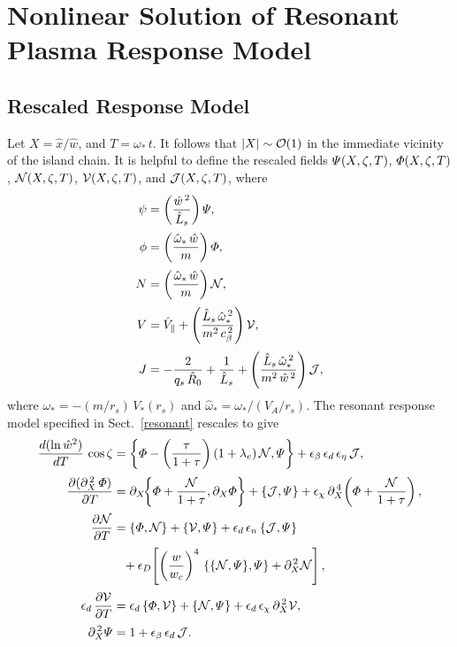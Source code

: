 \documentclass[12pt,prb,aps]{revtex4-1}
\begin{document}
\section{Nonlinear Solution of Resonant Plasma Response Model}
\subsection{Rescaled Response Model}\label{s8.2}
Let
$X = \hat{x}/\hat{w}$,
and
$T = \omega_\ast\,t$.
It follows that $|X|\sim {\cal O}(1)$ in the immediate vicinity of the island chain. It is helpful to define the
rescaled fields ${\mit\Psi}(X,\zeta,T)$, ${\mit\Phi}(X,\zeta,T)$, ${\cal N}(X,\zeta,T)$,
${\cal V}(X,\zeta,T)$, and ${\cal J}(X,\zeta,T)$, where
\begin{align}
\psi&= \left(\frac{\hat{w}^{\,2}}{\hat{L}_s}\right){\mit\Psi},\label{e466}\\[0.5ex]
\phi &=\left(\frac{\hat{\omega}_\ast\,\hat{w}}{m}\right){\mit\Phi},\\[0.5ex]
N &= \left(\frac{\hat{\omega}_\ast\,\hat{w}}{m}\right){\cal N},\\[0.5ex]
V&= \hat{V}_\parallel + \left(\frac{\hat{L}_s\,\hat{\omega}_\ast^{\,2}}{m^2\,c_\beta^{\,2}}\right){\cal V},\\[0.5ex]
J & =-\frac{2}{q_s\, \hat{R}_0} + \frac{1}{\hat{L}_s} + \left(\frac{\hat{L}_s\,\hat{\omega}_\ast^{\,2}}{m^2\,\hat{w}^{\,2}}\right){\cal J},
\end{align}
where $\omega_\ast = - (m/r_s)\,V_\ast(r_s)$ and $\hat{\omega}_\ast = \omega_\ast/(V_A/r_s)$. 
The resonant response model specified in Sect.~\ref{resonant} rescales to give
\begin{align}\label{e469}
\frac{d(\ln \hat{w}^2)}{dT}\,\cos\zeta &= \left\{{\mit\Phi}-\left(\frac{\tau}{1+\tau}\right)(1+\lambda_e)\,{\cal N}, {\mit\Psi}\right\}
+ \epsilon_\beta\,\epsilon_d\,\epsilon_\eta\,{\cal J},\\[0.5ex]
\frac{\partial(\partial_X^{\,2}\,{\mit\Phi})}{\partial T} &= \partial_X\!\!\left\{{\mit\Phi} + \frac{{\cal N}}{1+\tau},\partial_X{\mit\Phi}\right\}
+ \{{\cal J},{\mit\Psi}\}+ \epsilon_\chi \,\partial_X^{\,4}\!\left({\mit\Phi} + \frac{{\cal N}}{1+\tau}\right),\label{e470}\\[0.5ex]
\frac{\partial {\cal N}}{\partial T} &= \{{\mit\Phi}, {\cal N}\} + \{{\cal V},{\mit\Psi}\} + \epsilon_d\,\epsilon_n\,\{{\cal J},{\mit\Psi}\}\nonumber\\[0.5ex]&\phantom{=}
+ \epsilon_D \!\left[\left(\frac{w}{w_c}\right)^4\,\{\{{\cal N},{\mit\Psi}\}, {\mit\Psi}\}+\partial_X^{\,2}{\cal N}\right],\label{e471}\\[0.5ex]
\epsilon_d\,\frac{\partial {\cal V}}{\partial T} &= \epsilon_d\,\{{\mit\Phi},{\cal V}\}+\{{\cal N}, {\mit\Psi}\} + \epsilon_d\,\epsilon_\chi\,\partial_X^{\,2} {\cal V},\label{e472}\\[0.5ex]
\partial_X^{\,2}{\mit\Psi} &= 1+ \epsilon_\beta\,\epsilon_d\,{\cal J}.\label{e473}
\end{align}
\end{document}
